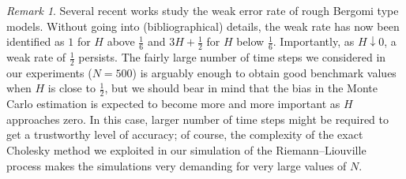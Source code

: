 \documentclass[11pt]{article}
\theoremstyle{plain}
\theoremstyle{definition}
\theoremstyle{remark}
\newtheorem{remark}[theorem]{Remark}
\newcommand{\blue}{\textcolor{blue}}
\newcommand{\1}{\mathbf{1}}
\numberwithin{equation}{section}
\begin{document}
\begin{remark} 
\label{rem:weak_error_rate}
Several recent works \cite{bayer2020weak, bayer2022weak, gassiat2022weak, friz2022weak} study the weak error rate of rough Bergomi type models. Without going into (bibliographical)
details, the weak rate has now been identified as $1$ for $H$ above $\frac 1 6$ and  $3H+\frac{1}{2}$ for $H$ below $\frac 1 6$. Importantly, as $H \downarrow 0$, a weak rate of $\frac 12$ persists. 
The fairly large number of time steps we considered in our experiments ($N = 500$) is arguably enough to obtain good benchmark values when $H$ is close to $\frac 1 2$, but we should bear in mind that the bias in the Monte Carlo estimation is expected to become more and more important as $H$ approaches zero. In this case, larger number of time steps might be required to get a trustworthy level of accuracy; of course, the complexity of the exact Cholesky method we exploited in our simulation of the Riemann--Liouville process makes the simulations very demanding for very large values of $N$.
\end{remark} 

\end{document}

